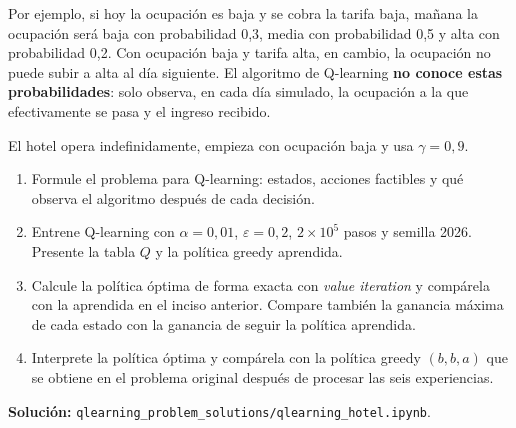 \noindent Por ejemplo, si hoy la ocupación es baja y se cobra la tarifa baja, mañana la ocupación será baja con probabilidad 0,3, media con probabilidad 0,5 y alta con probabilidad 0,2. Con ocupación baja y tarifa alta, en cambio, la ocupación no puede subir a alta al día siguiente. El algoritmo de Q-learning \textbf{no conoce estas probabilidades}: solo observa, en cada día simulado, la ocupación a la que efectivamente se pasa y el ingreso recibido.

\noindent El hotel opera indefinidamente, empieza con ocupación baja y usa $\gamma = 0{,}9$.

\begin{enumerate}
\item Formule el problema para Q-learning: estados, acciones factibles y qué observa el algoritmo después de cada decisión.
\item Entrene Q-learning con $\alpha = 0{,}01$, $\varepsilon = 0{,}2$, $2 \times 10^5$ pasos y semilla 2026. Presente la tabla $Q$ y la política greedy aprendida.
\item Calcule la política óptima de forma exacta con \emph{value iteration} y compárela con la aprendida en el inciso anterior. Compare también la ganancia máxima de cada estado con la ganancia de seguir la política aprendida.
\item Interprete la política óptima y compárela con la política greedy $(b, b, a)$ que se obtiene en el problema original después de procesar las seis experiencias.
\end{enumerate}

\noindent\textbf{Solución:} \texttt{qlearning\_problem\_solutions/qlearning\_hotel.ipynb}.
